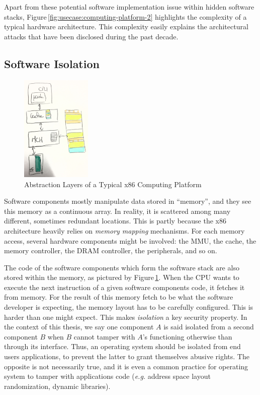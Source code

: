 Apart from these potential software implementation issue within hidden software
stacks, Figure\,\ref{fig:usecase:computing-platform-2} highlights the complexity
of a typical hardware architecture.
%
This complexity easily explains the architectural attacks that have been
disclosed during the past decade.

\subsection{Software Isolation}

\begin{figure}
  \centering
  \includegraphics[width=0.3\textwidth]{Figures/computing-platform-3.jpg}
  \caption{Abstraction Layers of a Typical x86 Computing Platform}
  \label{fig:usecase:computing-platform-3}
\end{figure}

Software components mostly manipulate data stored in ``memory'', and they see
this memory as a continuous array.
%
In reality, it is scattered among many different, sometimes redundant locations.
%
This is partly because the x86 architecture heavily relies on \emph{memory
  mapping} mechanisms.
%
For each memory access, several hardware components might be involved: the MMU,
the cache, the memory controller, the DRAM controller, the peripherals, and so
on.

The code of the software components which form the software stack are also
stored within the memory, as pictured by
Figure\,\ref{fig:usecase:computing-platform-3}.
%
When the CPU wants to execute the next instruction of a given software
components code, it fetches it from memory.
%
For the result of this memory fetch to be what the software developer is
expecting, the memory layout has to be carefully configured.
%
This is harder than one might expect.
%
This makes \emph{isolation} a key security property.
%
In the context of this thesis, we say one component $A$ is said isolated from a
second component $B$ when $B$ cannot tamper with $A$'s functioning otherwise
than through its interface.
%
Thus, an operating system should be isolated from end users applications, to
prevent the latter to grant themselves abusive rights.
%
The opposite is not necessarily true, and it is even a common practice for
operating system to tamper with applications code (\emph{e.g.} address space
layout randomization, dynamic libraries).

